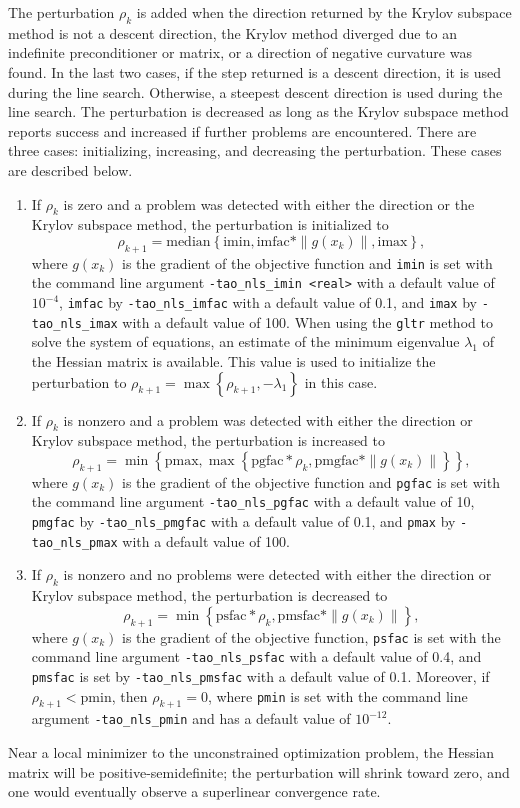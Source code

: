 The perturbation $\rho_k$ is added when the direction returned by the
Krylov subspace method is not a descent direction, the Krylov method
diverged due to an indefinite preconditioner or matrix, or a direction of 
negative curvature was found.  In the last two cases, if the step returned
is a descent direction, it is used during the line search.  Otherwise, a
steepest descent direction is used during the line search.  The perturbation
is decreased as long as the Krylov subspace method reports success and 
increased if further problems are encountered.  There are three cases:
initializing, increasing, and decreasing the perturbation.  These cases
are described below.
\begin{enumerate}
\item If $\rho_k$ is zero and a problem was detected with either the
direction or the Krylov subspace method, the perturbation is initialized to
\[
\rho_{k+1} = \mbox{median}\left\{\mbox{imin}, \mbox{imfac} * \|g(x_k)\|, \mbox{imax}\right\},
\]
where $g(x_k)$ is the gradient of the objective function and {\tt imin} is set 
with the command line argument {\tt -tao\_nls\_imin <real>} with a default 
value of $10^{-4}$, {\tt imfac} by {\tt -tao\_nls\_imfac} with a default 
value of 0.1, and {\tt imax} by {\tt -tao\_nls\_imax} with a default value 
of 100.  
When using the {\tt gltr} method to solve the system of equations, an
estimate of the minimum eigenvalue $\lambda_1$ of the Hessian matrix 
is available.  This value is used to initialize the perturbation to
$\rho_{k+1} = \max\left\{\rho_{k+1}, -\lambda_1\right\}$ in this
case.
\item If $\rho_k$ is nonzero and a problem was detected with either the 
direction or Krylov subspace method, the perturbation is increased to 
\[
\rho_{k+1} = \min\left\{\mbox{pmax}, \max\left\{\mbox{pgfac} * \rho_k, \mbox{pmgfac} * \|g(x_k)\|\right\}\right\},
\]
where $g(x_k)$ is the gradient of the objective function and {\tt pgfac} is set 
with the command line argument {\tt -tao\_nls\_pgfac}
with a default value of 10, {\tt pmgfac} by {\tt -tao\_nls\_pmgfac} with a
default value of 0.1, and {\tt pmax} by {\tt -tao\_nls\_pmax} with a default
value of 100.
\item If $\rho_k$ is nonzero and no problems were detected with either
the direction or Krylov subspace method, the perturbation is decreased to
\[
\rho_{k+1} = \min\left\{\mbox{psfac} * \rho_k, \mbox{pmsfac} * \|g(x_k)\|\right\},
\]
where $g(x_k)$ is the gradient of the objective function, {\tt psfac} is set 
with the command line argument {\tt -tao\_nls\_psfac}
with a default value of 0.4, and {\tt pmsfac} is set by {\tt -tao\_nls\_pmsfac}
with a default value of 0.1.  Moreover, if $\rho_{k+1} < \mbox{pmin}$, then 
$\rho_{k+1} = 0$, where {\tt pmin} is set with the command line argument 
{\tt -tao\_nls\_pmin} and has a default value of $10^{-12}$.
\end{enumerate}
Near a local minimizer to the unconstrained optimization problem, the
Hessian matrix will be positive-semidefinite; the perturbation will 
shrink toward zero, and one would eventually observe a superlinear
convergence rate.

